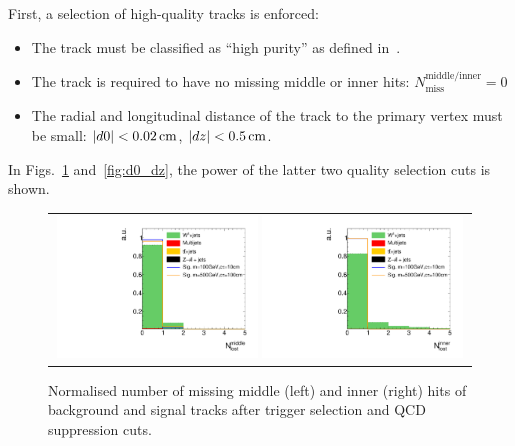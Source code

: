 First, a selection of high-quality tracks is enforced:
\begin{itemize}
\renewcommand{\labelitemi}{\footnotesize{\ding{118}}}
\item The track must be classified as ``high purity'' as defined in~\cite{bib:CMS:Tracking_2010}.
\item The track is required to have no missing middle or inner hits: $N_{\text{miss}}^{\text{middle/inner}}=0$
\item The radial and longitudinal  distance of the track to the primary vertex must be small: \mbox{$|d0|<0.02\,\text{cm}$}, \mbox{$|dz|<0.5\,\text{cm}$}.
\end{itemize}
In Figs.~\ref{fig:LostHits} and~\ref{fig:d0_dz}, the power of the latter two quality selection cuts is shown.\\
\begin{figure}[!b]
  \centering 
  \begin{tabular}{c}
    \includegraphics[width=0.49\textwidth]{figures/analysis_2/AnalysisSelection/chiTracksQCDsupressionTrigger_2Signals_FullBkg/htrackNLostMid_lin.pdf}
    \includegraphics[width=0.49\textwidth]{figures/analysis_2/AnalysisSelection/chiTracksQCDsupressionTrigger_2Signals_FullBkg/htrackNLostInner_lin.pdf}
  \end{tabular}
  \caption{Normalised number of missing middle (left) and inner (right) hits of background and signal tracks after trigger selection and QCD suppression cuts.}
  \label{fig:LostHits}
\end{figure}
